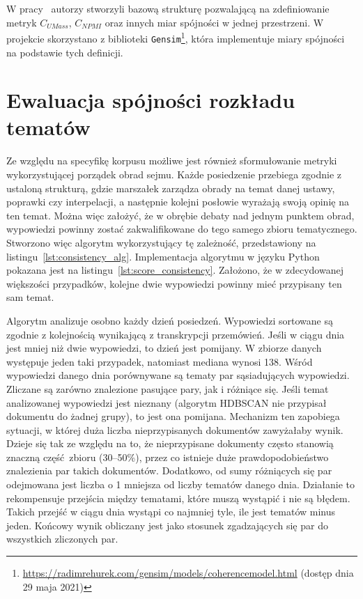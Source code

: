 	W pracy~\cite{Eval_Topics} autorzy stworzyli bazową strukturę pozwalającą na zdefiniowanie metryk \(C_{UMass}\), \(C_{NPMI}\)
		oraz innych miar spójności w jednej przestrzeni.
	W projekcie skorzystano z biblioteki \verb|Gensim|\footnote{\url{https://radimrehurek.com/gensim/models/coherencemodel.html} (dostęp dnia 29 maja 2021)},
		która implementuje miary spójności na podstawie tych definicji.

\section{Ewaluacja spójności rozkładu tematów}
	Ze względu na specyfikę korpusu możliwe jest również sformułowanie metryki wykorzystującej porządek obrad sejmu.
	Każde posiedzenie przebiega zgodnie z ustaloną strukturą, gdzie marszałek zarządza obrady na temat danej ustawy, poprawki czy interpelacji,
		a następnie kolejni posłowie wyrażają swoją opinię na ten temat.
	Można więc założyć, że w obrębie debaty nad jednym punktem obrad, wypowiedzi powinny zostać zakwalifikowane do tego samego zbioru tematycznego.
	Stworzono więc algorytm wykorzystujący tę zależność, przedstawiony na listingu~\ref{lst:consistency_alg}.
	Implementacja algorytmu w języku Python pokazana jest na listingu~\ref{lst:score_consistency}.
	Założono, że w zdecydowanej większości przypadków, kolejne dwie wypowiedzi powinny mieć przypisany ten sam temat.

	Algorytm analizuje osobno każdy dzień posiedzeń.
	Wypowiedzi sortowane są zgodnie z kolejnością wynikającą z transkrypcji przemówień.
	Jeśli w ciągu dnia jest mniej niż dwie wypowiedzi, to dzień jest pomijany.
	W zbiorze danych występuje jeden taki przypadek, natomiast mediana wynosi 138.
	Wśród wypowiedzi danego dnia porównywane są tematy par sąsiadujących wypowiedzi.
	Zliczane są zarówno znalezione pasujące pary, jak i różniące się.
	Jeśli temat analizowanej wypowiedzi jest nieznany (algorytm HDBSCAN nie przypisał dokumentu do żadnej grupy),
		to jest ona pomijana.
	Mechanizm ten zapobiega sytuacji, w której duża liczba nieprzypisanych dokumentów zawyżałaby wynik.
	Dzieje się tak ze względu na to, że nieprzypisane dokumenty często stanowią znaczną część zbioru (30--50\%),
		przez co istnieje duże prawdopodobieństwo znalezienia par takich dokumentów.
	Dodatkowo, od sumy różniących się par odejmowana jest liczba o 1 mniejsza od liczby tematów danego dnia.
	Działanie to rekompensuje przejścia między tematami, które muszą wystąpić i nie są błędem.
	Takich przejść w ciągu dnia wystąpi co najmniej tyle, ile jest tematów minus jeden.
	Końcowy wynik obliczany jest jako stosunek zgadzających się par do wszystkich zliczonych par.
	
